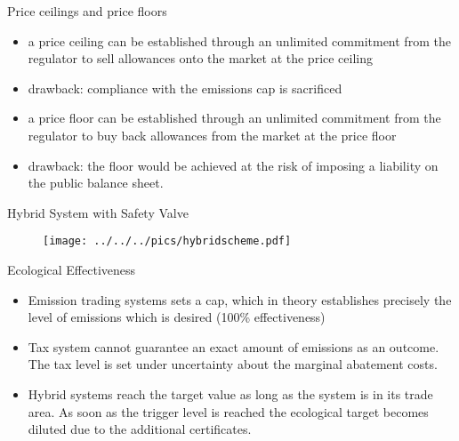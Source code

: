 {Price ceilings and price floors}
\begin{itemize}
\item<1-> a price ceiling can be established through an unlimited commitment from the regulator to sell allowances onto the market at the price ceiling
\item<2-> drawback: compliance with the emissions cap is sacrificed
\item<3-> a price floor can be established
through an unlimited commitment from the regulator to buy back
allowances from the market at the price floor
\item<4-> drawback: the floor would be achieved at the risk of
imposing a liability on the public balance sheet.
\end{itemize}



{Hybrid System with Safety Valve}


\begin{center}
\begin{figure}[h!]
\centering
\texttt{[image: ../../../pics/hybridscheme.pdf]}
\end{figure}
\end{center}





{Ecological Effectiveness}
\begin{itemize}
\item<1-> Emission trading systems sets a cap, which in theory establishes precisely the level of emissions which is desired (100\% effectiveness)
\item<2-> Tax system cannot guarantee an exact amount of emissions as an  outcome. The tax level is set under uncertainty about the marginal abatement costs.
\item<3-> Hybrid systems reach the target value as long as the system is in its trade area. As soon as the trigger level is reached the ecological target becomes diluted due to the additional certificates.
\end{itemize}



